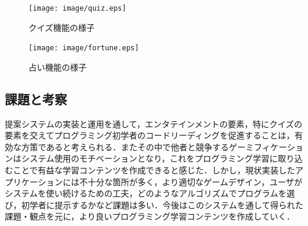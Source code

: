 \begin{figure}[!ht]
  \begin{center}
    \texttt{[image: image/quiz.eps]}
  \end{center}
    \vspace{-8mm} 
  \caption{クイズ機能の様子}
  \label{quiz}
\end{figure}

\begin{figure}[!ht]
  \begin{center}
    \texttt{[image: image/fortune.eps]}
  \end{center}
    \vspace{-8mm} 
  \caption{占い機能の様子}
  \label{fortune}
\end{figure}


\subsection{課題と考察}
提案システムの実装と運用を通して，エンタテインメントの要素，特にクイズの要素を交えてプログラミング初学者のコードリーディングを促進することは，有効な方策であると考えられる．またその中で他者と競争するゲーミフィケーションはシステム使用のモチベーションとなり，これをプログラミング学習に取り込むことで有益な学習コンテンツを作成できると感じた．しかし，現状実装したアプリケーションには不十分な箇所が多く，より適切なゲームデザイン，ユーザがシステムを使い続けるための工夫，どのようなアルゴリズムでプログラムを選び，初学者に提示するかなど課題は多い．今後はこのシステムを通して得られた課題・観点を元に，より良いプログラミング学習コンテンツを作成していく．
